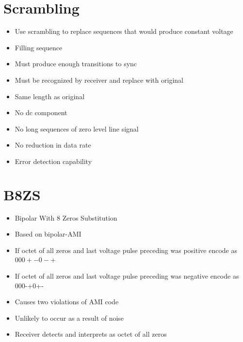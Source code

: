 \documentclass[10pt]{article}
\begin{document}
\section{Scrambling}
\begin{itemize}
  \item Use scrambling to replace sequences that would produce constant voltage

  \item Filling sequence

  \item Must produce enough transitions to sync

  \item Must be recognized by receiver and replace with original

  \item Same length as original

  \item No dc component

  \item No long sequences of zero level line signal

  \item No reduction in data rate

  \item Error detection capability

\end{itemize}

\section{B8ZS}
\begin{itemize}
  \item Bipolar With 8 Zeros Substitution

  \item Based on bipolar-AMI

  \item If octet of all zeros and last voltage pulse preceding was positive encode as $000+-0-+$

  \item If octet of all zeros and last voltage pulse preceding was negative encode as 000-+0+-

  \item Causes two violations of AMI code

  \item Unlikely to occur as a result of noise

  \item Receiver detects and interprets as octet of all zeros

\end{itemize}
\end{document}
